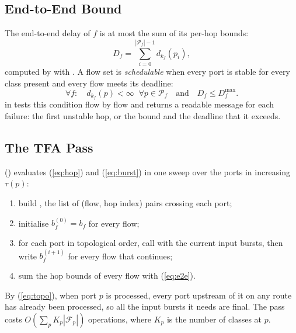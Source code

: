 \documentclass[9pt,a4paper,twocolumn,twoside]{tau-class/tau}
\providecommand{\eqref}[1]{(\ref{#1})}
\begin{document}
    \subsection{End-to-End Bound}

        The end-to-end delay of $f$ is at most the sum of its per-hop bounds:
        \begin{equation}\label{eq:e2e}
            D_f = \textstyle\sum_{i=0}^{|\mathcal{P}_f|-1} d_{k_f}(p_i),
        \end{equation}
        computed by  with . A flow set is \emph{schedulable} when every port is stable for every class present and every flow meets its deadline:
        \begin{equation}\label{eq:sched}
            \forall f:\quad d_{k_f}(p) < \infty \;\; \forall p \in \mathcal{P}_f \quad \mbox{and} \quad D_f \le D^{\max}_f .
        \end{equation}
         in  tests this condition flow by flow and returns a readable message for each failure: the first unstable hop, or the bound and the deadline that it exceeds.

    \subsection{The TFA Pass}

         () evaluates \eqref{eq:hop} and \eqref{eq:burst} in one sweep over the ports in increasing $\tau(p)$:
        \begin{enumerate}
            \item build , the list of (flow, hop index) pairs crossing each port;
            \item initialise $b^{(0)}_f = b_f$ for every flow;
            \item for each port in topological order, call  with the current input bursts, then write $b^{(i+1)}_f$ for every flow that continues;
            \item sum the hop bounds of every flow with \eqref{eq:e2e}.
        \end{enumerate}
        By \eqref{eq:topo}, when port $p$ is processed, every port upstream of it on any route has already been processed, so all the input bursts it needs are final. The pass costs $O(\sum_p K_p |\mathcal{F}_p|)$ operations, where $K_p$ is the number of classes at $p$.
\end{document}
